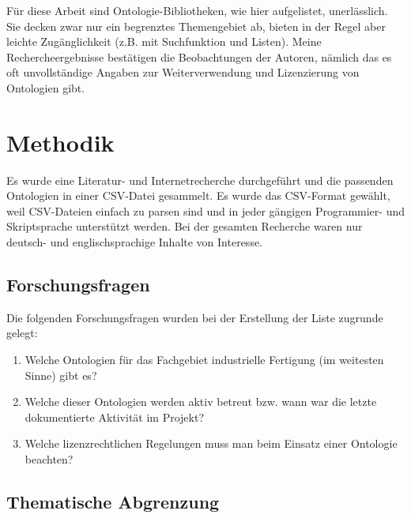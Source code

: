 \documentclass{article}
\begin{document}
Für diese Arbeit sind Ontologie-Bibliotheken, wie hier aufgelistet, unerlässlich.
Sie decken zwar nur ein begrenztes Themengebiet ab, bieten in der Regel aber leichte Zugänglichkeit (z.B. mit Suchfunktion und Listen).
Meine Rechercheergebnisse bestätigen die Beobachtungen der Autoren, nämlich das es oft unvollständige Angaben zur Weiterverwendung und Lizenzierung von Ontologien gibt.

\section{Methodik}

Es wurde eine Literatur- und Internetrecherche durchgeführt und die passenden Ontologien in einer CSV-Datei gesammelt.
Es wurde das CSV-Format gewählt, weil CSV-Dateien einfach zu parsen sind und in jeder gängigen Programmier- und Skriptsprache unterstützt werden.
Bei der gesamten Recherche waren nur deutsch- und englischsprachige Inhalte von Interesse.

\subsection{Forschungsfragen}

Die folgenden Forschungsfragen wurden bei der Erstellung der Liste zugrunde gelegt:

\begin{enumerate}
    \item Welche Ontologien für das Fachgebiet industrielle Fertigung (im weitesten Sinne) gibt es?
    \item Welche dieser Ontologien werden aktiv betreut bzw. wann war die letzte dokumentierte Aktivität im Projekt?
    \item Welche lizenzrechtlichen Regelungen muss man beim Einsatz einer Ontologie beachten?
\end{enumerate}

\subsection{Thematische Abgrenzung}
\end{document}

